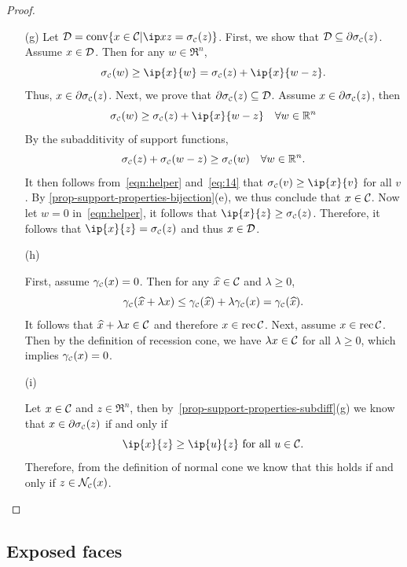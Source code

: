 \begin{proof}
\begin{itemize}
  \item[(g)] Let $\Dscr = \conv\{x\in\Cscr|\ip x z = \sigma\Cs(z)\}$. First, we
      show that $\mathcal{D} \subseteq \partial\sigma_{\scriptscriptstyle\mathcal{C}}(z)$. Assume $x \in \mathcal{D}$. Then
      for any $w \in \Re^n$,
    \[\sigma\Cs(w) \geq \ip{x}{w} = \sigma\Cs(z) + \ip{x}{w - z}.\]
    Thus, $x \in \partial\sigma_{\scriptscriptstyle\mathcal{C}}(z)$. Next, we prove that
    $\partial\sigma_{\scriptscriptstyle\mathcal{C}}(z) \subseteq \mathcal{D}$. Assume
    $x \in \partial\sigma_{\scriptscriptstyle\mathcal{C}}(z)$, then
    \begin{equation}\label{eqn:helper}
      \sigma\Cs(w) \geq \sigma\Cs(z) + \ip{x}{w - z} \quad \forall w \in \Re^n
    \end{equation}
    By the subadditivity of support functions,
    \begin{equation} \label{eq:14}
      \sigma_{\scriptscriptstyle\mathcal{C}}(z) + \sigma_{\scriptscriptstyle\mathcal{C}}(w - z) \geq \sigma_{\scriptscriptstyle\mathcal{C}}(w) \quad \forall w \in \mathbb{R}^n.
    \end{equation}
    It then follows from~\eqref{eqn:helper} and~\eqref{eq:14} that
    $\sigma\Cs(v) \geq \ip{x}{v}$ for all $v$.  By \autoref{prop-support-properties-bijection}(e), we thus
    conclude that $x \in \mathcal{C}$. Now let $w = 0$ in~\eqref{eqn:helper},
    it follows that $\ip{x}{z} \geq \sigma\Cs(z)$.  Therefore, it
    follows that $\ip{x}{z} = \sigma\Cs(z)$ and thus $x \in \mathcal{D}$.
  
  \item[(h)]
  
    First, assume $\gamma_{\scriptscriptstyle\mathcal{C}}(x) = 0$. Then for any $\xhat \in \Cscr$ and
    $\lambda \geq 0$,
    \[
      \gauge\Cs(\xhat + \lambda x) \leq \gauge\Cs(\xhat) +
      \lambda\gauge\Cs(x) = \gauge\Cs(\xhat).
    \]
    It follows that $\xhat + \lambda x \in \Cscr$ and therefore
    $x\in\operatorname{rec}\mathcal{C}$. Next, assume $x\in\operatorname{rec}\mathcal{C}$. Then by the
    definition of recession cone, we have $\lambda x \in \mathcal{C}$ for all
    $\lambda \geq 0$, which implies $\gamma_{\scriptscriptstyle\mathcal{C}}(x) = 0$.
  
  \item[(i)] 
  
    Let $x\in\mathcal{C}$ and $z\in\Re^n$, then by~\autoref{prop-support-properties-subdiff}(g) we know that $x\in\partial\sigma_{\scriptscriptstyle\mathcal{C}}(z)$ if and only if 
    \[\ip{x}{z} \geq \ip{u}{z} \mbox{ for all } u \in \Cscr.\]
    Therefore, from the definition of normal cone we know that this holds if and only if $z \in \mathcal{N}_{\scriptscriptstyle\mathcal{C}}(x)$.
  \end{itemize}	
  \end{proof}

\subsection{Exposed faces} \label{sec:exposed-faces}

